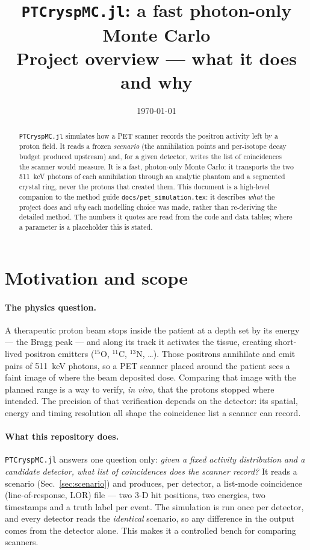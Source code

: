 \documentclass[11pt]{article}
\title{\texttt{PTCryspMC.jl}: a fast photon-only Monte Carlo\\
\large Project overview --- what it does and why}
\author{}
\date{\today}
\begin{document}
\maketitle

\begin{abstract}
\noindent
\texttt{PTCryspMC.jl} simulates how a PET scanner records the positron activity left by a
proton field. It reads a frozen \emph{scenario} (the annihilation points and per-isotope
decay budget produced upstream) and, for a given detector, writes the list of coincidences
the scanner would measure. It is a fast, photon-only Monte Carlo: it transports the two
\SI{511}{keV} photons of each annihilation through an analytic phantom and a segmented
crystal ring, never the protons that created them. This document is a high-level companion
to the method guide \texttt{docs/pet\_simulation.tex}: it describes \emph{what} the project
does and \emph{why} each modelling choice was made, rather than re-deriving the detailed
method. The numbers it quotes are read from the code and data tables; where a parameter is
a placeholder this is stated.
\end{abstract}

\tableofcontents

\section{Motivation and scope}
\label{sec:motivation}

\paragraph{The physics question.}
A therapeutic proton beam stops inside the patient at a depth set by its energy --- the
Bragg peak --- and along its track it activates the tissue, creating short-lived
positron emitters ($^{15}$O, $^{11}$C, $^{13}$N, \dots). Those positrons annihilate and
emit pairs of \SI{511}{keV} photons, so a PET scanner placed around the patient sees a
faint image of where the beam deposited dose. Comparing that image with the planned range
is a way to verify, \emph{in vivo}, that the protons stopped where intended. The precision
of that verification depends on the detector: its spatial, energy and timing resolution all
shape the coincidence list a scanner can record.

\paragraph{What this repository does.}
\texttt{PTCryspMC.jl} answers one question only: \emph{given a fixed activity distribution
and a candidate detector, what list of coincidences does the scanner record?} It reads a
scenario (Sec.~\ref{sec:scenario}) and produces, per detector, a list-mode coincidence
(line-of-response, LOR) file --- two \mbox{3-D} hit positions, two energies, two timestamps
and a truth label per event. The simulation is run once per detector, and every detector
reads the \emph{identical} scenario, so any difference in the output comes from the detector
alone. This makes it a controlled bench for comparing scanners.
\end{document}
